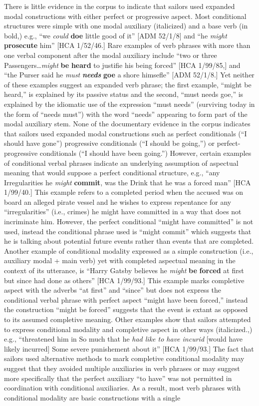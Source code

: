 There is little evidence in the corpus to indicate that sailors used expanded modal constructions with either perfect or progressive aspect. Most conditional structures were simple with one modal auxiliary (italicized) and a base verb (in bold,) e.g., “we \textit{could} \textbf{doe} little good of it” [ADM 52/1/8] and “he \textit{might} \textbf{prosecute} him” [HCA 1/52/46.] Rare examples of verb phrases with more than one verbal component after the modal auxiliary include “two or three Passengers…\textit{might} \textbf{be} \textbf{heard} to justifie his being forced” [HCA 1/99/85,] and “the Purser said he \textit{must} \textbf{\textit{needs}} \textbf{goe} a shore himsefle” [ADM 52/1/8.] Yet neither of these examples suggest an expanded verb phrase; the first example, “might be heard,” is explained by its passive status and the second, “must needs goe,” is explained by the idiomatic use of the expression “must needs” (surviving today in the form of “needs must”) with the word “needs” appearing to form part of the modal auxiliary stem. None of the documentary evidence in the corpus indicates that sailors used expanded modal constructions such as perfect conditionals (“I should have gone”) progressive conditionals (“I should be going,”) or perfect-progressive conditionals (“I should have been going.”) However, certain examples of conditional verbal phrases indicate an underlying assumption of aspectual meaning that would suppose a perfect conditional structure, e.g., “any Irregularities he \textit{might} \textbf{commit}, was the Drink that he was a forced man” [HCA 1/99/40.] This example refers to a completed period when the accused was on board an alleged pirate vessel and he wishes to express repentance for any “irregularities” (i.e., crimes) he might have committed in a way that does not incriminate him. However, the perfect conditional “might have committed” is not used, instead the conditional phrase used is “might commit” which suggests that he is talking about potential future events rather than events that are completed. Another example of conditional modality expressed as a simple construction (i.e., auxiliary modal + main verb) yet with completed aspectual meaning in the context of its utterance, is “Harry Gatsby believes he \textit{might} \textbf{be} \textbf{forced} at first but since had done as others” [HCA 1/99/93.] This example marks completive aspect with the adverbs “at first” and “since” but does not express the conditional verbal phrase with perfect aspect “might have been forced,” instead the construction “might be forced” suggests that the event is extant as opposed to its assumed completive meaning. Other examples show that sailors attempted to express conditional modality and completive aspect in other ways (italicized.,) e.g., “threatened him in So much that he \textit{had like to have incurid} [would have likely incurred] Some severe punishement about it” [HCA 1/99/93.] The fact that sailors used alternative methods to mark completive conditional modality may suggest that they avoided multiple auxiliaries in verb phrases or may suggest more specifically that the perfect auxiliary “to have” was not permitted in coordination with conditional auxiliaries. As a result, most verb phrases with conditional modality are basic constructions with a single 